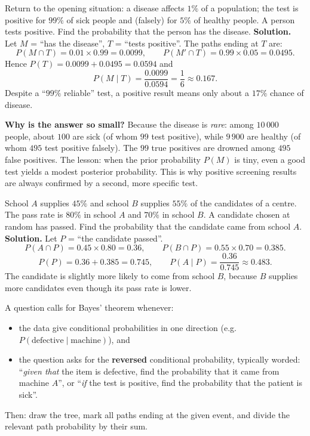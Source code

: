\documentclass[11pt]{article}
\newcounter{popsec}
\newcounter{popsub}
\newcommand{\courssub}[1]{%
  \stepcounter{popsub}%
  \par\vspace{9pt}\noindent{\popxbold\fontsize{11.5}{13}\selectfont\color{popink}{\color{poporange}\thepopsec.\thepopsub}\hspace{6pt}#1}\par\nopagebreak\vspace{4pt}
}
\begin{document}
\begin{exoresolu}
Return to the opening situation: a disease affects $1\%$ of a population; the test is positive for $99\%$ of sick people and (falsely) for $5\%$ of healthy people. A person tests positive. Find the probability that the person has the disease.
\tcblower
\textbf{Solution.} Let $M$ = ``has the disease'', $T$ = ``tests positive''. The paths ending at $T$ are:
\[
P(M\cap T)=0.01\times 0.99=0.0099,\qquad P(M'\cap T)=0.99\times 0.05=0.0495.
\]
Hence $P(T)=0.0099+0.0495=0.0594$ and
\[
P(M\mid T)=\frac{0.0099}{0.0594}=\frac{1}{6}\approx 0.167.
\]
Despite a ``$99\%$ reliable'' test, a positive result means only about a $17\%$ chance of disease.
\end{exoresolu}

\textbf{Why is the answer so small?} Because the disease is \emph{rare}: among $10\,000$ people, about $100$ are sick (of whom $99$ test positive), while $9\,900$ are healthy (of whom $495$ test positive falsely). The $99$ true positives are drowned among $495$ false positives. The lesson: when the prior probability $P(M)$ is tiny, even a good test yields a modest posterior probability. This is why positive screening results are always confirmed by a second, more specific test.

\begin{exoresolu}
School $A$ supplies $45\%$ and school $B$ supplies $55\%$ of the candidates of a centre. The pass rate is $80\%$ in school $A$ and $70\%$ in school $B$. A candidate chosen at random has passed. Find the probability that the candidate came from school $A$.
\tcblower
\textbf{Solution.} Let $P$ = ``the candidate passed''.
\[
P(A\cap P)=0.45\times0.80=0.36,\qquad P(B\cap P)=0.55\times0.70=0.385.
\]
\[
P(P)=0.36+0.385=0.745,\qquad
P(A\mid P)=\frac{0.36}{0.745}\approx 0.483.
\]
The candidate is slightly more likely to come from school $B$, because $B$ supplies more candidates even though its pass rate is lower.
\end{exoresolu}

\courssub{GCE exam technique}

\begin{methode}
A question calls for Bayes' theorem whenever:
\begin{itemize}
\item the data give conditional probabilities in one direction (e.g.\ $P(\text{defective}\mid\text{machine})$), and
\item the question asks for the \textbf{reversed} conditional probability, typically worded: ``\emph{given that} the item is defective, find the probability that it came from machine $A$'', or ``\emph{if} the test is positive, find the probability that the patient is sick''.
\end{itemize}
Then: draw the tree, mark all paths ending at the given event, and divide the relevant path probability by their sum.
\end{methode}
\end{document}
